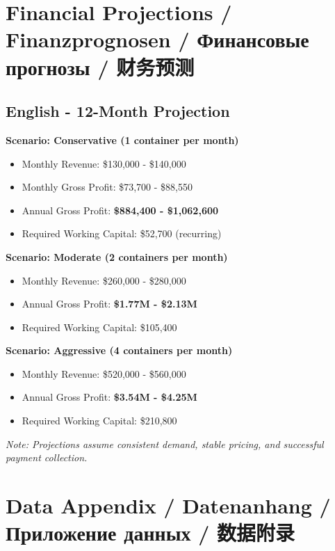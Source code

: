 \documentclass[12pt,a4paper]{article}
\begin{document}
\newpage

\section{Financial Projections / Finanzprognosen / Финансовые прогнозы / 财务预测}

\subsection*{English - 12-Month Projection}

\textbf{Scenario: Conservative (1 container per month)}
\begin{itemize}
    \item Monthly Revenue: \$130,000 - \$140,000
    \item Monthly Gross Profit: \$73,700 - \$88,550
    \item Annual Gross Profit: \textbf{\$884,400 - \$1,062,600}
    \item Required Working Capital: \$52,700 (recurring)
\end{itemize}

\textbf{Scenario: Moderate (2 containers per month)}
\begin{itemize}
    \item Monthly Revenue: \$260,000 - \$280,000
    \item Annual Gross Profit: \textbf{\$1.77M - \$2.13M}
    \item Required Working Capital: \$105,400
\end{itemize}

\textbf{Scenario: Aggressive (4 containers per month)}
\begin{itemize}
    \item Monthly Revenue: \$520,000 - \$560,000
    \item Annual Gross Profit: \textbf{\$3.54M - \$4.25M}
    \item Required Working Capital: \$210,800
\end{itemize}

\textit{Note: Projections assume consistent demand, stable pricing, and successful payment collection.}


\newpage

\section{Data Appendix / Datenanhang / Приложение данных / 数据附录}
\end{document}
